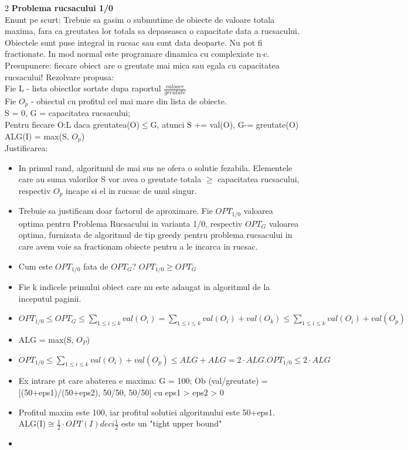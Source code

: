 \documentclass[a4paper]{article}
\begin{document}
\begin{multicols}{2}
\textbf{Problema rucsacului 1/0}\\
Enunt pe scurt: Trebuie sa gasim o submutime de obiecte de valoare totala maxima, fara ca greutatea lor totala sa depaseasca o capacitate data a rucsacului. Obiectele sunt puse integral in rucsac sau sunt data deoparte. Nu pot fi fractionate. 
In mod normal este programare dinamica cu complexiate n$\cdot$c. Presupunere: fiecare obiect are o greutate mai mica sau egala cu capacitatea rucsacului! 
Rezolvare propusa: \\
Fie L - lista obiectlor sortate dupa raportul $\frac{valoare}{greutate}$ \\
Fie $ O_p$ - obiectul cu profitul cel mai mare din lista de obiecte. \\
S = 0, G = capacitatea rucsacului; \\
Pentru fiecare O:L daca greutatea(O)$\leq$G, atunci S += val(O), G-= greutate(O) \\
ALG(I) = max(S, $O_p$) \\
Justificarea:
\begin{itemize}
    \item In primul rand, algoritmul de mai sus ne ofera o solutie fezabila. Elementele care au suma valorilor S vor avea o greutate totala $\geq$ capacitatea rucsacului, respectiv $O_p$ incape si el in rucsac de unul singur.
    \item Trebuie sa justificam doar factorul de aproximare. Fie $OPT_{1/0}$ valoarea optima pentru Problema Rucsacului in varianta 1/0, respectiv $OPT_G$ valoarea optima, furnizata de algoritmul de tip greedy pentru problema rucsacului in care avem voie sa fractionam obiecte pentru a le incarca in rucsac. 
    \item Cum este $OPT_{1/0}$ fata de $OPT_G$? \quad $OPT_{1/0} \geq OPT_G$
    \item Fie k indicele primului obiect care nu este adaugat in algoritmul de la inceputul paginii.
    \item $OPT_{1/0} \leq OPT_G \leq \sum_{1 \leq i \leq k} val(O_i) = \sum_{1 \leq i \leq k} val(O_i) + val(O_k) \leq \sum_{1 \leq i \leq k} val(O_i) + val(O_p)$
    \item ALG = max(S, $O_P$)
    \item $OPT_{1/0} \leq \sum_{1 \leq i \leq k} val(O_i) + val(O_p) \leq ALG + ALG = 2 \cdot ALG. OPT_{1/0} \leq 2 \cdot ALG$
    \item Ex intrare pt care abaterea e maxima: G = 100; Ob (val/greutate) = [(50+eps1)/(50+eps2), 50/50, 50/50] cu eps1 > eps2 > 0
    \item Profitul maxim este 100, iar profitul solutiei algoritmului este 50+eps1. ALG(I)$ \cong \frac{1}{2} \cdot OPT(I) deci \frac{1}{2}$ este un "tight upper bound" 
    \item 
\end{itemize}


\end{multicols}
\end{document}
